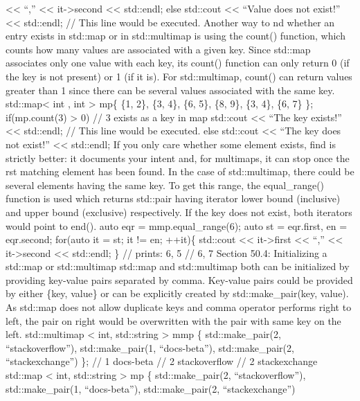 \textless\textless{} ``,'' \textless\textless{} it-\textgreater second
\textless\textless{} std::endl; else std::cout \textless\textless{}
``Value does not exist!'' \textless\textless{} std::endl; // This line
would be executed. Another way to nd whether an entry exists in std::map
or in std::multimap is using the count() function, which counts how many
values are associated with a given key. Since std::map associates only
one value with each key, its count() function can only return 0 (if the
key is not present) or 1 (if it is). For std::multimap, count() can
return values greater than 1 since there can be several values
associated with the same key. std::map\textless{} int , int
\textgreater{} mp\{ \{1, 2\}, \{3, 4\}, \{6, 5\}, \{8, 9\}, \{3, 4\},
\{6, 7\} \}; if(mp.count(3) \textgreater{} 0) // 3 exists as a key in
map std::cout \textless\textless{} ``The key exists!''
\textless\textless{} std::endl; // This line would be executed. else
std::cout \textless\textless{} ``The key does not exist!''
\textless\textless{} std::endl; If you only care whether some element
exists, find is strictly better: it documents your intent and, for
multimaps, it can stop once the rst matching element has been found. In
the case of std::multimap, there could be several elements having the
same key. To get this range, the equal\_range() function is used which
returns std::pair having iterator lower bound (inclusive) and upper
bound (exclusive) respectively. If the key does not exist, both
iterators would point to end(). auto eqr = mmp.equal\_range(6); auto st
= eqr.first, en = eqr.second; for(auto it = st; it != en; ++it)\{
std::cout \textless\textless{} it-\textgreater first
\textless\textless{} ``,'' \textless\textless{} it-\textgreater second
\textless\textless{} std::endl; \} // prints: 6, 5 // 6, 7 Section 50.4:
Initializing a std::map or std::multimap std::map and std::multimap both
can be initialized by providing key-value pairs separated by comma.
Key-value pairs could be provided by either \{key, value\} or can be
explicitly created by std::make\_pair(key, value). As std::map does not
allow duplicate keys and comma operator performs right to left, the pair
on right would be overwritten with the pair with same key on the left.
std::multimap \textless{} int, std::string \textgreater{} mmp \{
std::make\_pair(2, ``stackoverflow''), std::make\_pair(1,
``docs-beta''), std::make\_pair(2, ``stackexchange'') \}; // 1 docs-beta
// 2 stackoverflow // 2 stackexchange std::map \textless{} int,
std::string \textgreater{} mp \{ std::make\_pair(2, ``stackoverflow''),
std::make\_pair(1, ``docs-beta''), std::make\_pair(2, ``stackexchange'')
